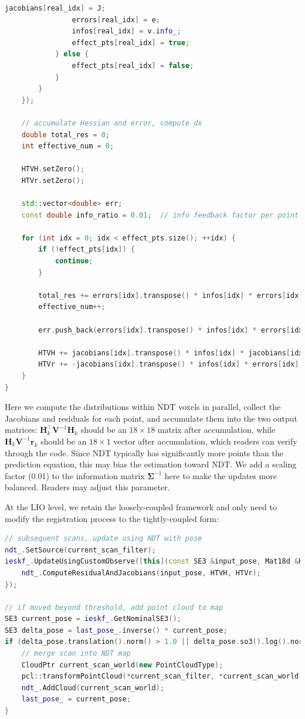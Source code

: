 \begin{lstlisting}[language=c++,caption=src/ch7/ndt\_inc.cc]
				jacobians[real_idx] = J;
				errors[real_idx] = e;
				infos[real_idx] = v.info_;
				effect_pts[real_idx] = true;
			} else {
				effect_pts[real_idx] = false;
			}
		}
	});
	
	// accumulate Hessian and error, compute dx
	double total_res = 0;
	int effective_num = 0;
	
	HTVH.setZero();
	HTVr.setZero();
	
	std::vector<double> err;
	const double info_ratio = 0.01;  // info feedback factor per point
	
	for (int idx = 0; idx < effect_pts.size(); ++idx) {
		if (!effect_pts[idx]) {
			continue;
		}
		
		total_res += errors[idx].transpose() * infos[idx] * errors[idx];
		effective_num++;
		
		err.push_back(errors[idx].transpose() * infos[idx] * errors[idx]);
		
		HTVH += jacobians[idx].transpose() * infos[idx] * jacobians[idx] * info_ratio;
		HTVr += -jacobians[idx].transpose() * infos[idx] * errors[idx] * info_ratio;
	}
}
\end{lstlisting}

Here we compute the distributions within NDT voxels in parallel, collect the Jacobians and residuals for each point, and accumulate them into the two output matrices: $\mathbf{H}_k^\top \mathbf{V}^{-1} \mathbf{H}_k$ should be an $18 \times 18$ matrix after accumulation, while $\mathbf{H}_k \mathbf{V}^{-1} \mathbf{r}_k$ should be an $18\times 1$ vector after accumulation, which readers can verify through the code. Since NDT typically has significantly more points than the prediction equation, this may bias the estimation toward NDT. We add a scaling factor (0.01) to the information matrix $\boldsymbol{\Sigma}^{-1}$ here to make the updates more balanced. Readers may adjust this parameter.

At the LIO level, we retain the loosely-coupled framework and only need to modify the registration process to the tightly-coupled form:

\begin{lstlisting}[language=c++,caption=src/ch8/lio-iekf/lio\_iekf.cc]
// subsequent scans, update using NDT with pose
ndt_.SetSource(current_scan_filter);
ieskf_.UpdateUsingCustomObserve([this](const SE3 &input_pose, Mat18d &HTVH, Vec18d &HTVr) {
	ndt_.ComputeResidualAndJacobians(input_pose, HTVH, HTVr);
});

// if moved beyond threshold, add point cloud to map
SE3 current_pose = ieskf_.GetNominalSE3();
SE3 delta_pose = last_pose_.inverse() * current_pose;
if (delta_pose.translation().norm() > 1.0 || delta_pose.so3().log().norm() > math::deg2rad(10)) {
	// merge scan into NDT map
	CloudPtr current_scan_world(new PointCloudType);
	pcl::transformPointCloud(*current_scan_filter, *current_scan_world, current_pose.matrix());
	ndt_.AddCloud(current_scan_world);
	last_pose_ = current_pose;
}
\end{lstlisting}

